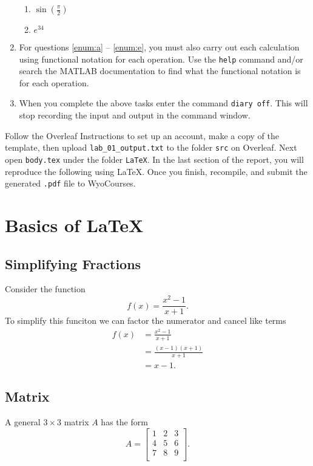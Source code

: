 \begin{enumerate}[(1)]
\begin{enumerate}
          \item \label{enum:i} $\sin\left(\frac{\pi}{2}\right)$
          \item \label{enum:j} $e^{34}$
        \end{enumerate}
      \item For questions \ref{enum:a} -- \ref{enum:e}, you must also carry out each calculation using functional notation for each operation. Use the \verb`help` command and/or search the MATLAB documentation to find what the functional notation is for each operation.
    \item When you complete the above tasks enter the command \verb`diary off`. This will stop recording the input and output in the command window.
\end{enumerate}
Follow the Overleaf Instructions to set up an account, make a copy of the template, then upload \verb`lab_01_output.txt` to the folder \verb`src` on Overleaf. Next open \verb|body.tex| under the folder \verb|LaTeX|. In the last section of the report, you will reproduce the following using \LaTeX{}.
Once you finish, recompile, and submit the generated \verb|.pdf| file to WyoCourses.

\section{Basics of \LaTeX{}}
\subsection{Simplifying Fractions}
Consider the function
$$
f(x) = \frac{x^2 - 1}{x + 1}.
$$
To simplify this funciton we can factor the numerator and cancel like terms
\begin{align*}
    f(x)
       & = \frac{x^2 - 1}{x + 1}
    \\ & = \frac{(x - 1) (x + 1)}{x + 1}
    \\ & = x - 1.
\end{align*}

\subsection{Matrix}
A general $3 \times 3$ matrix $A$ has the form
$$
A =
\begin{bmatrix}
    1 & 2 & 3 \\
    4 & 5 & 6 \\
    7 & 8 & 9 \\
\end{bmatrix}.
$$

